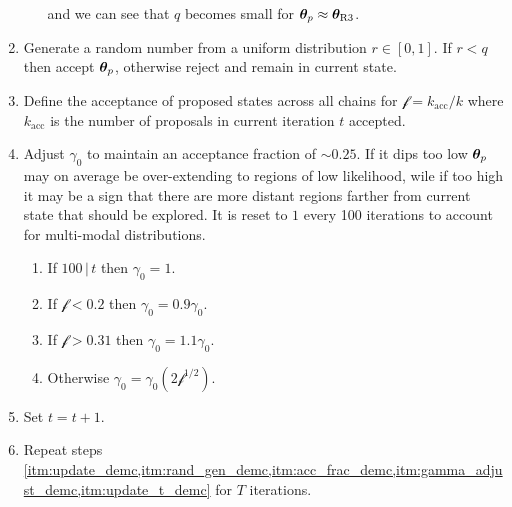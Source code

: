 \begin{enumerate}
\begin{enumerate}
\noindent and we can see that $q$ becomes small for $\boldsymbol{\theta}_p \approx \boldsymbol{\theta}_{\mathrm{R3}}$.
\end{enumerate}

\item \label{itm:rand_gen_demc} Generate a random number from a uniform distribution $r \in [0, 1]$.  If $r < q$ then accept
$\boldsymbol{\theta}_p$, otherwise reject
and remain in current state.

\item \label{itm:acc_frac_demc} Define the acceptance of proposed states across all chains for $\mathscr{f} = k_{\mathrm{acc}}/k$ where
$k_{\mathrm{acc}}$ is the number of proposals in current iteration $t$ accepted.

\item \label{itm:gamma_adjust_demc} Adjust $\gamma_0$ to maintain an acceptance fraction of ${\sim} 0.25$.  If it dips too low
$\boldsymbol{\theta}_p$ may on average be
over-extending to regions of low likelihood, wile if too high it may be a sign that there are more distant regions farther from current
state that should be explored.  It is reset to $1$ every 100 iterations to account for multi-modal distributions.

\begin{enumerate}[label=(\roman*)]
\item If $100\, |\, t$ then $\gamma_0 = 1$.

\item If $\mathscr{f} < 0.2$ then $\gamma_0 = 0.9 \gamma_0$.

\item If $\mathscr{f} > 0.31$ then $\gamma_0 = 1.1 \gamma_0$.

\item Otherwise $\gamma_0 = \gamma_0 (2\mathscr{f}^{1/2})$.
\end{enumerate}

\item \label{itm:update_t_demc} Set $t = t + 1$.

\item Repeat steps \cref{itm:update_demc,itm:rand_gen_demc,itm:acc_frac_demc,itm:gamma_adjust_demc,itm:update_t_demc} for $T$ iterations.
\end{enumerate}

